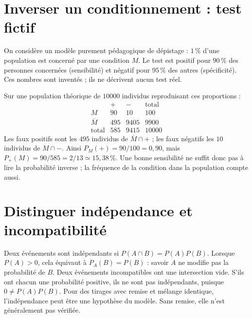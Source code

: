 \documentclass[../cours_2de.tex]{subfiles}
\begin{document}
\section{Inverser un conditionnement : test fictif}
On considère un modèle purement pédagogique de dépistage : $1\,\%$ d'une population est concerné par une condition $M$.
Le test est positif pour $90\,\%$ des personnes concernées (sensibilité) et négatif pour $95\,\%$ des autres (spécificité).
Ces nombres sont inventés ; ils ne décrivent aucun test réel.
\begin{center}
\end{center}
Sur une population théorique de $10000$ individus reproduisant ces proportions :
\[
\begin{array}{c|rr|r}
 &+&-&\text{total}\\\hline
M&90&10&100\\
\overline M&495&9405&9900\\\hline
\text{total}&585&9415&10000
\end{array}
\]
Les faux positifs sont les $495$ individus de $\overline M\cap+$ ; les faux négatifs les $10$ individus de $M\cap-$.
Ainsi $P_M(+)=90/100=0{,}90$, mais
$P_+(M)=90/585=2/13\simeq15{,}38\,\%$.
Une bonne sensibilité ne suffit donc pas à lire la probabilité inverse ; la fréquence de la condition dans la population compte aussi.
\section{Distinguer indépendance et incompatibilité}
\approfondissement Deux événements sont indépendants si $P(A\cap B)=P(A)P(B)$.
Lorsque $P(A)>0$, cela équivaut à $P_A(B)=P(B)$ : savoir $A$ ne modifie pas la probabilité de $B$.
Deux événements incompatibles ont une intersection vide. S'ils ont chacun une probabilité positive, ils ne sont pas indépendants, puisque $0\ne P(A)P(B)$.
Pour des tirages avec remise et mélange identique, l'indépendance peut être une hypothèse du modèle. Sans remise, elle n'est généralement pas vérifiée.
\end{document}
